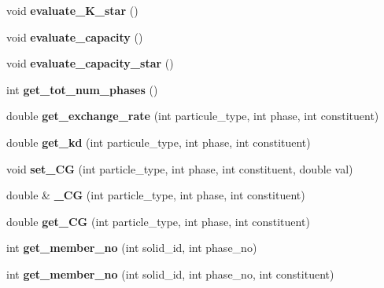 \begin{DoxyCompactItemize}
void {\bfseries evaluate\+\_\+\+K\+\_\+star} ()
\item 
\mbox{\label{class_c_m_b_block_a7628449fe20311300f317ee45d835351}} 
void {\bfseries evaluate\+\_\+capacity} ()
\item 
\mbox{\label{class_c_m_b_block_a5f00353d01e85272688e1f7530d05443}} 
void {\bfseries evaluate\+\_\+capacity\+\_\+star} ()
\item 
\mbox{\label{class_c_m_b_block_a716aaee7cdfbfda5f5c7a561e7288a26}} 
int {\bfseries get\+\_\+tot\+\_\+num\+\_\+phases} ()
\item 
\mbox{\label{class_c_m_b_block_a431f5029e7bcb92d5bc2e0b8813031af}} 
double {\bfseries get\+\_\+exchange\+\_\+rate} (int particule\+\_\+type, int phase, int constituent)
\item 
\mbox{\label{class_c_m_b_block_a0a5cad888cbfc00e6132de8dd17f3e1e}} 
double {\bfseries get\+\_\+kd} (int particule\+\_\+type, int phase, int constituent)
\item 
\mbox{\label{class_c_m_b_block_af98e5c1648eba8db74ca00c15246e044}} 
void {\bfseries set\+\_\+\+CG} (int particle\+\_\+type, int phase, int constituent, double val)
\item 
\mbox{\label{class_c_m_b_block_a35ba920a242997f037a1d041a0ec10e5}} 
double \& {\bfseries \+\_\+\+CG} (int particle\+\_\+type, int phase, int constituent)
\item 
\mbox{\label{class_c_m_b_block_a67b7de1f9e728ad73e9b231355574488}} 
double {\bfseries get\+\_\+\+CG} (int particle\+\_\+type, int phase, int constituent)
\item 
\mbox{\label{class_c_m_b_block_aaa2eb08829f2b39cc77d9a84a045cdb2}} 
int {\bfseries get\+\_\+member\+\_\+no} (int solid\+\_\+id, int phase\+\_\+no)
\item 
\mbox{\label{class_c_m_b_block_aee3c55f7971d19bba82e566adfa4b675}} 
int {\bfseries get\+\_\+member\+\_\+no} (int solid\+\_\+id, int phase\+\_\+no, int constituent)

\end{DoxyCompactItemize}
